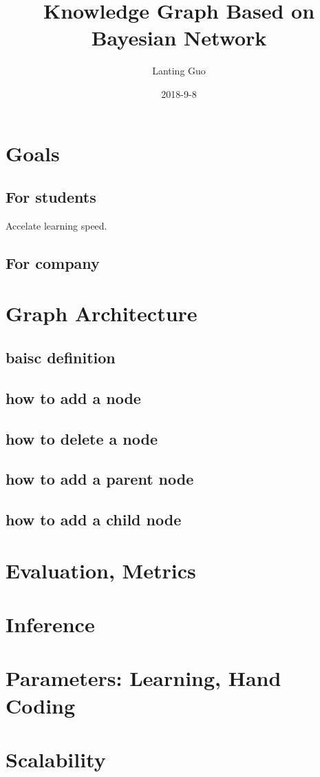 \documentclass{article}
\title{Knowledge Graph Based on Bayesian Network}
\date{2018-9-8}
\author{Lanting Guo}
\begin{document}
\maketitle
\newpage
{}

\section{Goals}
\subsection{For students}
Accelate learning speed.
\subsection{For company}
\section{Graph Architecture}
\subsection{baisc definition}
\subsection{how to add a node}
\subsection{how to delete a node}
\subsection{how to add a parent node}
\subsection{how to add a child node}

\section{Evaluation, Metrics}

\section{Inference}

\section{Parameters: Learning, Hand Coding}

\section{Scalability}
\end{document}
